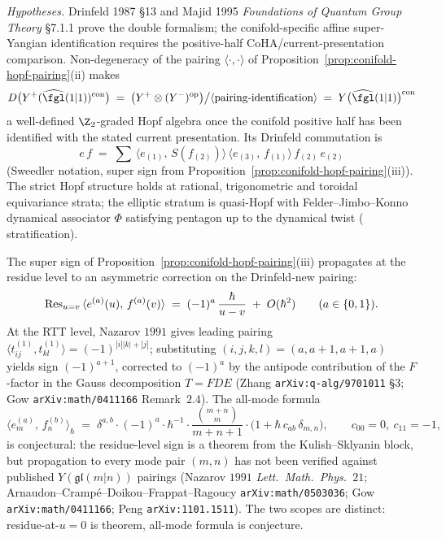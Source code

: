 \begin{corollary}
\label{cor:conifold-drinfeld-double}
\noindent\emph{Hypotheses.} Drinfeld 1987 \S13 and Majid 1995 \emph{Foundations of Quantum Group Theory} \S7.1.1 prove the double formalism; the conifold-specific affine super-Yangian identification requires the positive-half CoHA/current-presentation comparison.
Non-degeneracy of the pairing $\langle \cdot, \cdot \rangle$ of
Proposition~\textup{\ref{prop:conifold-hopf-pairing}(ii)} makes
\[
 D\bigl(Y^+(\widehat{\fgl}(1|1))^{\mathrm{con}}\bigr)
 \;=\;
 \bigl(Y^+ \otimes (Y^-)^{\mathrm{op}}\bigr) \big/
 \langle\text{pairing-identification}\rangle
 \;=\;
 Y\bigl(\widehat{\fgl}(1|1)\bigr)^{\mathrm{con}}
\]
a well-defined $\Z_2$-graded Hopf algebra once the conifold positive
half has been identified with the stated current presentation. Its
Drinfeld commutation is
\[
 e\, f \;=\; \sum\,\bigl\langle e_{(1)},\, S(f_{(2)})\bigr\rangle\,
 \bigl\langle e_{(3)},\, f_{(1)}\bigr\rangle\,
 f_{(2)}\, e_{(2)}
\]
\textup{(}Sweedler notation, super sign from
Proposition~\textup{\ref{prop:conifold-hopf-pairing}(iii)}\textup{).}
The strict Hopf structure holds at rational, trigonometric and toroidal
equivariance strata; the elliptic stratum is quasi-Hopf with
Felder--Jimbo--Konno dynamical associator $\Phi$ satisfying pentagon
up to the dynamical twist \textup{(} stratification\textup{).}
\end{corollary}

\begin{remark}[Asymmetric correction $c_{11} = -1$ at residue level versus all-mode formula]
\label{rem:conifold-c11-residue-vs-all-mode}
The super sign of Proposition~\textup{\ref{prop:conifold-hopf-pairing}(iii)}
propagates at the residue level to an asymmetric correction on the
Drinfeld-new pairing:
\[
 \mathrm{Res}_{u = v}\,\langle e^{(a)}(u),\, f^{(a)}(v)\rangle
 \;=\; (-1)^a\,\frac{\hbar}{u - v} \;+\; O(\hbar^2)
 \qquad
 \textup{(}a \in \{0, 1\}\textup{).}
\]
At the RTT level, Nazarov $1991$ gives leading pairing
$\langle t^{(1)}_{ij}, t^{(1)}_{kl}\rangle = (-1)^{|i||k| + |j|}$;
substituting $(i, j, k, l) = (a, a{+}1, a{+}1, a)$ yields sign
$(-1)^{a+1}$, corrected to $(-1)^a$ by the antipode contribution of
the $F$-factor in the Gauss decomposition $T = F D E$
\textup{(}Zhang \texttt{arXiv:q-alg/9701011} \S$3$;
Gow \texttt{arXiv:math/0411166} Remark~$2.4$\textup{).}
The all-mode formula
\[
 \langle e^{(a)}_m,\, f^{(b)}_n \rangle_\hbar
 \;=\; \delta^{a,b}\cdot(-1)^a\cdot\hbar^{-1}\cdot
 \frac{\binom{m+n}{m}}{m + n + 1}
 \cdot\bigl(1 + \hbar\, c_{a b}\, \delta_{m, n}\bigr),
 \qquad
 c_{00} = 0,\ c_{11} = -1,
\]
is conjectural: the
residue-level sign is a theorem from the Kulish--Sklyanin block, but
propagation to every mode pair $(m, n)$ has not been verified against
published $Y(\mathfrak{gl}(m|n))$ pairings \textup{(}Nazarov $1991$
\emph{Lett.~Math.~Phys.}~$21$;
Arnaudon--Crampé--Doikou--Frappat--Ragoucy \texttt{arXiv:math/0503036};
Gow \texttt{arXiv:math/0411166};
Peng \texttt{arXiv:1101.1511}\textup{).} The two scopes are distinct:
residue-at-$u = 0$ is theorem, all-mode formula is conjecture.
\end{remark}

